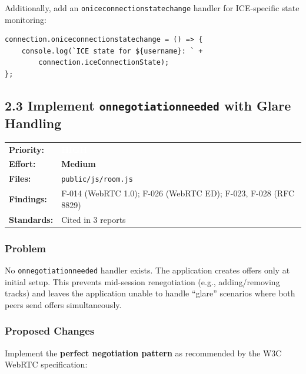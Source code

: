 \documentclass[11pt,letterpaper]{article}
\newcommand{\prihigh}{\colorbox{major}{\textcolor{white}{\small\textbf{HIGH}}}}
\newcommand{\effmedium}{\colorbox{partial!30}{\small\textbf{Medium}}}
\begin{document}
Additionally, add an \texttt{oniceconnectionstatechange} handler for ICE-specific state monitoring:

\begin{verbatim}
connection.oniceconnectionstatechange = () => {
    console.log(`ICE state for ${username}: ` +
        connection.iceConnectionState);
};
\end{verbatim}

\newpage

\subsection{2.3 Implement \texttt{onnegotiationneeded} with Glare Handling}

\begin{tabular}{ll}
\textbf{Priority:} & \prihigh \\
\textbf{Effort:} & \effmedium \\
\textbf{Files:} & \texttt{public/js/room.js} \\
\textbf{Findings:} & F-014 (WebRTC 1.0); F-026 (WebRTC ED); F-023, F-028 (RFC 8829) \\
\textbf{Standards:} & Cited in 3 reports \\
\end{tabular}

\subsubsection{Problem}

No \texttt{onnegotiationneeded} handler exists. The application creates offers only at initial setup. This prevents mid-session renegotiation (e.g., adding/removing tracks) and leaves the application unable to handle ``glare'' scenarios where both peers send offers simultaneously.

\subsubsection{Proposed Changes}

Implement the \textbf{perfect negotiation pattern} as recommended by the W3C WebRTC specification:
\end{document}
